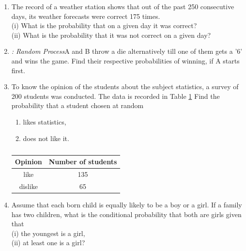 \begin{enumerate}[label=\thesection.\arabic*.,ref=\thesection.\theenumi]
\begin{table}[!ht]
\centering
{}
\caption{}
\label{table:prob_exam_3}
\end{table}
\solution


   \item The record of a weather station shows that out of the past 250 consecutive days, its weather forecasts were correct 175 times.\\
   (i) What is the probability that on a given day it was correct?\\
(ii) What is the probability that it was not correct on a given day?\\
\solution



\item {\em: Random Process}A and B throw a die alternatively till one of them gets a '6' and wins the game. Find their respective probabilities of winning, if A starts first.
\\
\solution

%
\item To know the opinion of the students about the subject statistics, a survey of 200 students was conducted. The data is recorded in Table \ref{table:1.2.6}
Find the probability that a student chosen at random
\begin{enumerate}
\item likes statistics,
\item  does not like it.
\end{enumerate}
\begin{table}[!ht]
\centering
\begin{tabular}{ |c|c| } 
 \hline
 \textbf{Opinion} &\textbf{Number of students}\\
 \hline
 like  &135\\ 
 \hline
 dislike  &65\\ 
 \hline
\end{tabular}
\caption{}
\label{table:1.2.6}
\end{table}
\solution

\item  Assume that each born child is equally likely to be a boy or a girl. If a family has two children, what is the conditional probability that both are girls given that\\
(i) the youngest is a girl,\\ 
(ii) at least one is a girl?\\
\solution



\end{enumerate}
